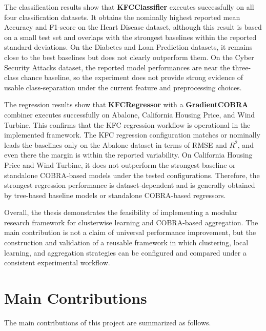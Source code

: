 The classification results show that \textbf{KFCClassifier} executes successfully on all four classification datasets. It obtains the nominally highest reported mean Accuracy and F1-score on the Heart Disease dataset, although this result is based on a small test set and overlaps with the strongest baselines within the reported standard deviations. On the Diabetes and Loan Prediction datasets, it remains close to the best baselines but does not clearly outperform them. On the Cyber Security Attacks dataset, the reported model performances are near the three-class chance baseline, so the experiment does not provide strong evidence of usable class-separation under the current feature and preprocessing choices.

The regression results show that \textbf{KFCRegressor} with a \textbf{GradientCOBRA} combiner executes successfully on Abalone, California Housing Price, and Wind Turbine. This confirms that the KFC regression workflow is operational in the implemented framework. The KFC regression configuration matches or nominally leads the baselines only on the Abalone dataset in terms of RMSE and $R^2$, and even there the margin is within the reported variability. On California Housing Price and Wind Turbine, it does not outperform the strongest baseline or standalone COBRA-based models under the tested configurations. Therefore, the strongest regression performance is dataset-dependent and is generally obtained by tree-based baseline models or standalone COBRA-based regressors.

Overall, the thesis demonstrates the feasibility of implementing a modular research framework for clusterwise learning and COBRA-based aggregation. The main contribution is not a claim of universal performance improvement, but the construction and validation of a reusable framework in which clustering, local learning, and aggregation strategies can be configured and compared under a consistent experimental workflow.

\section{Main Contributions}
\label{sec:main_contributions}

\hs The main contributions of this project are summarized as follows.

